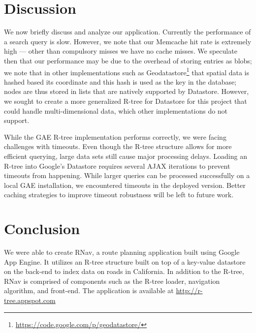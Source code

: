\documentclass{scrartcl}
\begin{document}
\section{Discussion}
\label{sec:analysis}
We now briefly discuss and analyze our application. Currently the performance of a search query is slow. However, we note that our Memcache hit rate is extremely high --- other than compulsory misses we have no cache misses. We speculate then that our performance may be due to the overhead of storing entries as blobs; we note that in other implementations such as Geodatastore\footnote{\url{https://code.google.com/p/geodatastore/}} that spatial data is hashed based its coordinate and this hash is used as the key in the database; nodes are thus stored in lists that are natively supported by Datastore. However, we sought to create a more generalized R-tree for Datastore for this project that could handle multi-dimensional data, which other implementations do not support.

While the GAE R-tree implementation performs correctly, we were facing challenges with timeouts. Even though the R-tree structure allows for more efficient querying, large data sets still cause major processing delays. Loading an R-tree into Google's Datastore requires several AJAX iterations to prevent timeouts from happening. While larger queries can be processed successfully on a local GAE installation, we encountered timeouts in the deployed version. Better caching strategies to improve timeout robustness will be left to future work.

\section{Conclusion}
\label{sec:conclusion}
We were able to create RNav, a route planning application built using Google App Engine. It utilizes an R-tree structure built on top of a key-value datastore on the back-end to index data on roads in California. In addition to the R-tree, RNav is comprised of components such as the R-tree loader, navigation algorithm, and front-end. The application is available at \url{http://r-tree.appspot.com}



\end{document}
